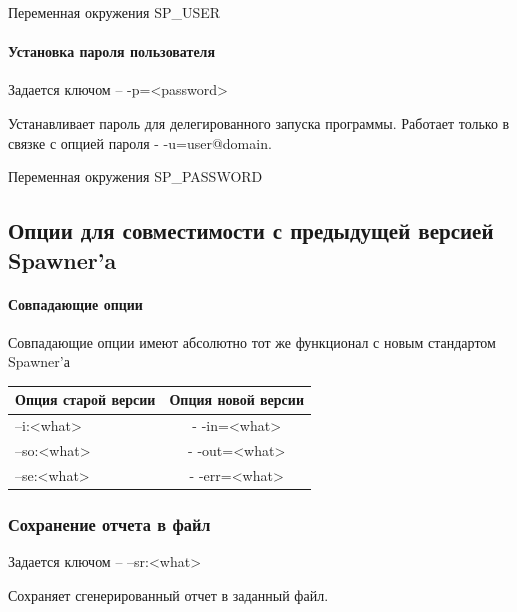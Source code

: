 \documentclass{imcs}
\begin{document}
Переменная окружения   SP\_USER

\paragraph{Установка пароля пользователя}
Задается ключом  -- -p=<password>

Устанавливает пароль для делегированного запуска программы. Работает только в связке с опцией пароля - -u=user@domain. 

Переменная окружения   SP\_PASSWORD




\subsection{Опции для совместимости с предыдущей версией Spawner'a}
\paragraph{Совпадающие опции}
Совпадающие опции имеют абсолютно тот же функционал с новым стандартом Spawner’а
\begin{table}[h!]
\begin{center}
\begin{tabular}{|l|c|}
\hline
Опция старой версии & Опция новой версии\\
\hline
–i:<what> & - -in=<what>\\
\hline
–so:<what> &  - -out=<what>\\
\hline
–se:<what> & - -err=<what>\\
\hline
\end{tabular}
\end{center}
\end{table}

\subsubsection{Сохранение отчета в файл}
Задается ключом -- –sr:<what>

Сохраняет сгенерированный отчет в заданный файл. 
\end{document}
